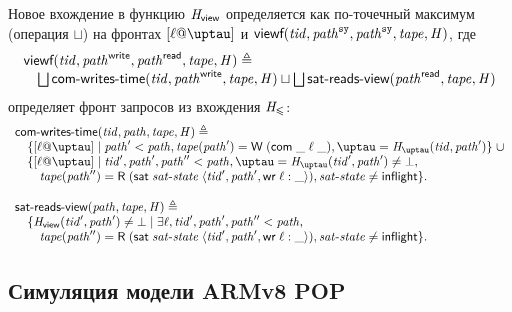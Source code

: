 Новое вхождение в функцию $\mathit{H}_{\mathsf{view}}$ определяется как по-точечный максимум (операция $\sqcup$)
на фронтах $[\loc@\tau]$ и
$\textbf{\sf viewf}(\mathit{tid}, \mathit{path}^{\mathtt{sy}}, \mathit{path}^{\mathtt{sy}}, \mathit{tape}, \mathit{H})$, где
\[\begin{array}{l}
\textbf{\sf viewf}(\mathit{tid}, \mathit{path}^{\bf \sf write}, \mathit{path}^{\bf \sf read}, \mathit{tape}, \mathit{H}) \triangleq \\
\quad \bigsqcup \textsf{com-writes-time}(\mathit{tid}, \mathit{path}^{\bf \sf write}, \mathit{tape}, \mathit{H}) \sqcup \bigsqcup \textsf{sat-reads-view}(\mathit{path}^{\bf \sf read}, \mathit{tape}, \mathit{H})
\end{array}\]
определяет фронт запросов из вхождения $\mathit{H}_{\leqslant}$:
\[\begin{array}{l}
\opstau(\tId, \cpath, \tape, \hmap) \triangleq \\
\quad \{[\loc @ \tau] \mid
        \cpath' < \cpath, \tape(\cpath') = \tapeWrite{(\tapeWriteCommitted{\_}{\loc}{\_})},
        \tau = \tmap(\tId , \cpath')
        \} \; \cup \\
\quad \{[\loc @ \tau] \mid
        \tId', \cpath', \cpath'' < \cpath,  \tau = \tmap(\tId', \cpath') \not = \bot, \\
\quad \quad \tape(\cpath'') = \tapeRead{(\tapeSatisfied{\satisfiedState}{\stRequestWrite{\tId'}{ \cpath'}{\loc}{\_}})},
        \satisfiedState \not = \SatisfiedInFlight \}. \\
\\
\readsSatisfiedR(\cpath, \tape, \hmap) \triangleq \\
\quad \{\rmap(\tId', \cpath') \not = \bot \mid \exists \loc, \tId', \cpath', \cpath'' < \cpath,\\
\quad \quad \tape(\cpath'') = \tapeRead{(\tapeSatisfied{\satisfiedState}{\stRequestWrite{\tId'}{ \cpath'}{\loc}{\_}})},
        \satisfiedState \not = \SatisfiedInFlight \}. \\
\end{array}\]

\subsection{Симуляция модели ARMv8 POP}
\label{sec:armvpop:armt:sim}

